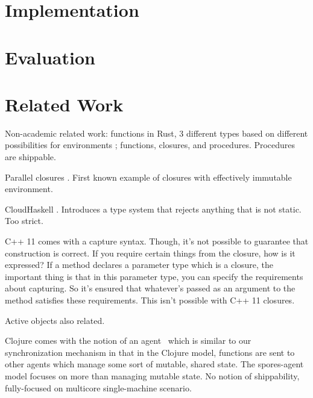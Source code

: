 \documentclass{llncs}
\begin{document}
\section{Implementation}

\section{Evaluation}

%

\section{Related Work}

Non-academic related work: functions in Rust, 3 different types based on
different possibilities for environments \cite{RustFunctions}; functions,
closures, and procedures. Procedures are shippable.

Parallel closures \cite{ParallelClosures}. First known example of closures
with effectively immutable environment.

CloudHaskell \cite{CloudHaskell}. Introduces a type system that rejects anything
that is not static. Too strict.

C++ 11 comes with a capture syntax. Though, it's not possible to guarantee that construction is correct. If you require certain things from the closure, how is it expressed? If a method declares a parameter type which is a closure, the important thing is that in this parameter type, you can specify the requirements about capturing. So it's ensured that whatever's passed as an argument to the method satisfies these requirements. This isn't possible with C++ 11 closures. \cite{Cplusplus11Spec}

Active objects also related. \cite{ActiveObjects}

Clojure comes with the notion of an agent~\cite{Clojure} which is similar to our synchronization mechanism in that in the Clojure model, functions are sent to other agents which manage some sort of mutable, shared state. The spores-agent model focuses on more than managing mutable state. No notion of shippability, fully-focused on multicore single-machine scenario.



\end{document}
